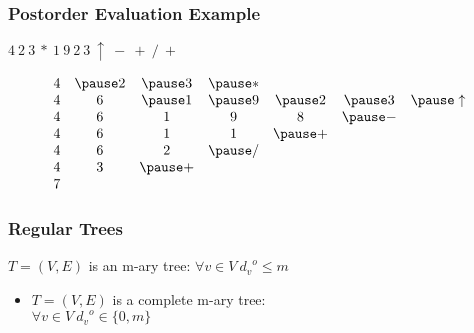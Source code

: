 \documentclass[dvipsnames]{beamer}
\begin{document}
\begin{frame}
  \frametitle{Postorder Evaluation Example}

  \begin{example}[$t ~ u ~ v ~ * ~ w ~ x ~ y ~ z ~ \uparrow ~ - ~ + ~ / ~ +$]
    $4 ~ 2 ~ 3 ~ * ~ 1 ~ 9 ~ 2 ~ 3 ~ \uparrow ~ - ~ + ~ / ~ +$

    \pause
    \medskip
    \[
      \begin{array}{ccccccc}
  4 & \pause 2 & \pause 3 & \pause * &          &          &                \\
  4 &        6 & \pause 1 & \pause 9 & \pause 2 & \pause 3 & \pause \uparrow\\
  4 &        6 &        1 &        9 &        8 & \pause - &                \\
  4 &        6 &        1 &        1 & \pause + &          &                \\
  4 &        6 &        2 & \pause / &          &          &                \\
  4 &        3 & \pause + &          &          &          &                \\
  7 &          &          &          &          &          &                \\
      \end{array}
    \]
  \end{example}
\end{frame}

\begin{frame}
  \frametitle{Regular Trees}

  \begin{definition}
    $T=(V,E)$ is an \alert{m-ary tree}: $\forall v \in V~{d_v}^o \leq m$
  \end{definition}

  \begin{itemize}
    \item $T=(V,E)$ is a complete m-ary tree:\\
      $\forall v \in V~{d_v}^o \in \{0,m\}$
  \end{itemize}

\end{frame}
\end{document}
